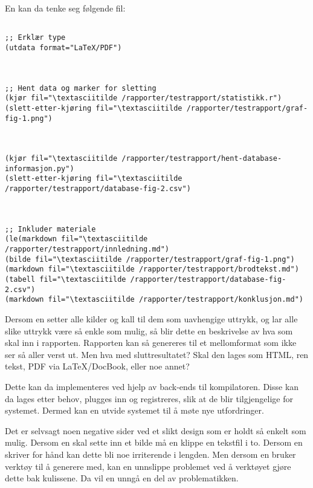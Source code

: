 \documentclass[11pt]{article}
\begin{document}
En kan da tenke seg følgende fil:

\begin{lstlisting}

;; Erklær type
(utdata format="LaTeX/PDF")



;; Hent data og marker for sletting
(kjør fil="\textasciitilde /rapporter/testrapport/statistikk.r")
(slett-etter-kjøring fil="\textasciitilde /rapporter/testrapport/graf-fig-1.png")



(kjør fil="\textasciitilde /rapporter/testrapport/hent-database-informasjon.py")
(slett-etter-kjøring fil="\textasciitilde /rapporter/testrapport/database-fig-2.csv")



;; Inkluder materiale
(le(markdown fil="\textasciitilde /rapporter/testrapport/innledning.md")
(bilde fil="\textasciitilde /rapporter/testrapport/graf-fig-1.png")
(markdown fil="\textasciitilde /rapporter/testrapport/brodtekst.md")
(tabell fil="\textasciitilde /rapporter/testrapport/database-fig-2.csv")
(markdown fil="\textasciitilde /rapporter/testrapport/konklusjon.md")

\end{lstlisting}




Dersom en setter alle kilder og kall til dem som uavhengige uttrykk, og lar alle slike uttrykk være så enkle som mulig, så blir dette en beskrivelse av hva som skal inn i rapporten. Rapporten kan så genereres til et mellomformat som ikke ser så aller verst ut. Men hva med sluttresultatet? Skal den lages som HTML, ren tekst, PDF via LaTeX/DocBook, eller noe annet?



Dette kan da implementeres ved hjelp av back-ends til kompilatoren. Disse kan da lages etter behov, plugges inn og registreres, slik at de blir tilgjengelige for systemet. Dermed kan en utvide systemet til å møte nye utfordringer.



Det er selvsagt noen negative sider ved et slikt design som er holdt så enkelt som mulig. Dersom en skal sette inn et bilde må en klippe en tekstfil i to. Dersom en skriver for hånd kan dette bli noe irriterende i lengden. Men dersom en bruker verktøy til å generere med, kan en unnslippe problemet ved å verktøyet gjøre dette bak kulissene. Da vil en unngå en del av problematikken.
\end{document}
